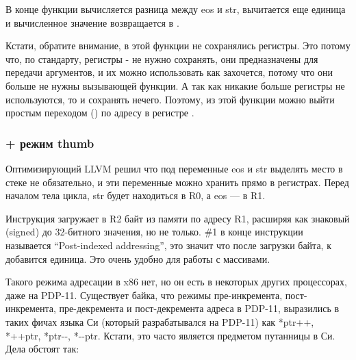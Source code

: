 В конце функции вычисляется разница между eos и str, вычитается еще единица и вычисленное значение возвращается в .

Кстати, обратите внимание, в этой функции не сохранялись регистры. Это потому что, по стандарту, регистры - 
не нужно сохранять, они предназначены для передачи аргументов, и их можно использовать как захочется, потому что они больше 
не нужны вызывающей функции. 
А так как никакие больше регистры не используются, то и сохранять нечего. Поэтому, из этой функции можно выйти
простым переходом () по адресу в регистре \LR.


\subsubsection{\OptimizingXcode + режим thumb}



Оптимизирующий LLVM решил что под переменные eos и str выделять место в стеке не обязательно, и эти переменные можно хранить
прямо в регистрах. Перед началом тела цикла, str будет находиться в R0, а eos --- в R1.

Инструкция  загружает в R2 байт из памяти по адресу R1, расширяя как знаковый (signed) до 32-битного
значения, но не только. \#1 в конце инструкции называется ``Post-indexed addressing'', это значит что после загрузки байта,
к  добавится единица. Это очень удобно для работы с массивами.

Такого режима адресации в x86 нет, но он есть в некоторых других процессорах, даже на PDP-11. Существует байка, что режимы
пре-инкремента, пост-инкремента, пре-декремента и пост-декремента адреса в PDP-11, выразились в таких фичах языка Си (который
разрабатывался на PDP-11) как *ptr++, *++ptr, *ptr-{}-, *-{}-ptr. Кстати, это часто является предметом путанницы в Си.
Дела обстоят так: 


